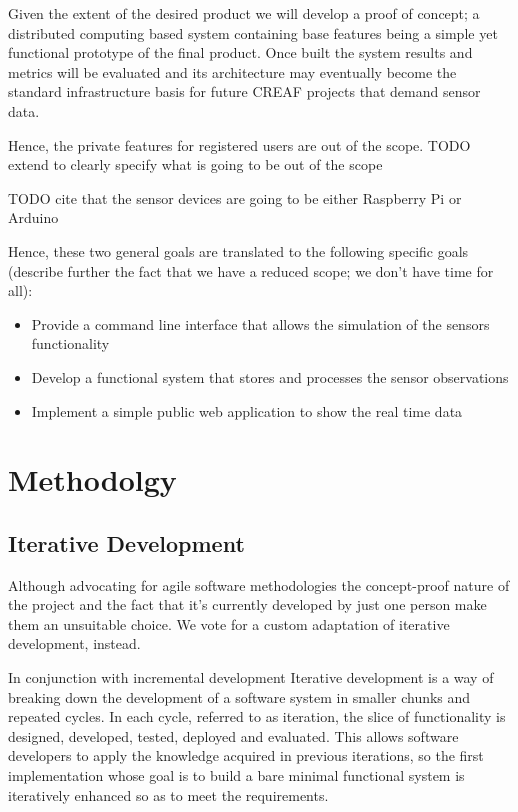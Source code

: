 Given the extent of the desired product we will develop a proof of concept; a distributed computing based system containing base features being a simple yet functional prototype of the final product. Once built the system results and metrics will be evaluated and its architecture may eventually become the standard infrastructure basis for future CREAF projects that demand sensor data.

Hence, the private features for registered users are out of the scope. TODO extend to clearly specify what is going to be out of the scope

TODO cite that the sensor devices are going to be either Raspberry Pi or Arduino

Hence, these two general goals are translated to the following specific goals (describe further the fact that we have a reduced scope; we don't have time for all):

\begin{itemize}
	\item Provide a command line interface that allows the simulation of the sensors functionality
	\item Develop a functional system that stores and processes the sensor observations
	\item Implement a simple public web application to show the real time data
\end{itemize}

\section{Methodolgy}

\subsection{Iterative Development}
Although advocating for agile software methodologies the concept-proof nature of the project and the fact that it's currently developed by just one person make them an unsuitable choice. We vote for a custom adaptation of iterative development, instead.

In conjunction with incremental development Iterative development is a way of breaking down the development of a software system in smaller chunks and repeated cycles. In each cycle, referred to as iteration, the slice of functionality is designed, developed, tested, deployed and evaluated. This allows software developers to apply the knowledge acquired in previous iterations, so the first implementation whose goal is to build a bare minimal functional system is iteratively enhanced so as to meet the requirements.

